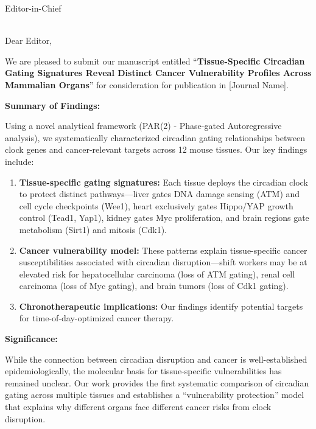 \documentclass[11pt]{letter}
\begin{document}
\begin{letter}{Editor-in-Chief \\ [Journal Name] \\ [Journal Address]}

\opening{Dear Editor,}

We are pleased to submit our manuscript entitled ``\textbf{Tissue-Specific Circadian Gating Signatures Reveal Distinct Cancer Vulnerability Profiles Across Mammalian Organs}'' for consideration for publication in [Journal Name].

\textbf{Summary of Findings:}

Using a novel analytical framework (PAR(2) - Phase-gated Autoregressive analysis), we systematically characterized circadian gating relationships between clock genes and cancer-relevant targets across 12 mouse tissues. Our key findings include:

\begin{enumerate}
    \item \textbf{Tissue-specific gating signatures:} Each tissue deploys the circadian clock to protect distinct pathways---liver gates DNA damage sensing (ATM) and cell cycle checkpoints (Wee1), heart exclusively gates Hippo/YAP growth control (Tead1, Yap1), kidney gates Myc proliferation, and brain regions gate metabolism (Sirt1) and mitosis (Cdk1).
    
    \item \textbf{Cancer vulnerability model:} These patterns explain tissue-specific cancer susceptibilities associated with circadian disruption---shift workers may be at elevated risk for hepatocellular carcinoma (loss of ATM gating), renal cell carcinoma (loss of Myc gating), and brain tumors (loss of Cdk1 gating).
    
    \item \textbf{Chronotherapeutic implications:} Our findings identify potential targets for time-of-day-optimized cancer therapy.
\end{enumerate}

\textbf{Significance:}

While the connection between circadian disruption and cancer is well-established epidemiologically, the molecular basis for tissue-specific vulnerabilities has remained unclear. Our work provides the first systematic comparison of circadian gating across multiple tissues and establishes a ``vulnerability protection'' model that explains why different organs face different cancer risks from clock disruption.


\end{letter}
\end{document}
